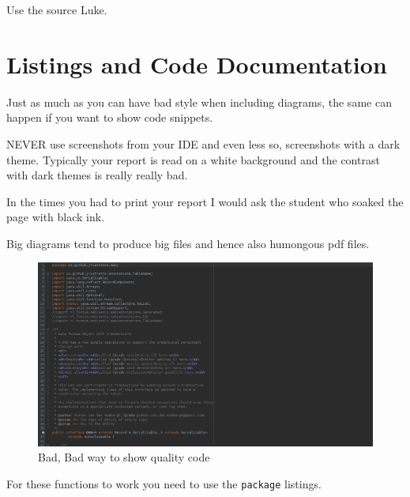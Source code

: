 \def\TheFile{ch05_codelisting.tex}
\begin{savequote}[15cm]
  \vspace{-30mm}
  \sffamily\raggedleft
  Use the source Luke.
\end{savequote}

\chapter{Listings and Code Documentation}
\label{chap:listings}
Just as much as you can have bad style when including diagrams, the same can happen if
you want to show code snippets.

\begin{Itemize}
\item {\color{red!60!black}\Huge{}NEVER} use screenshots from your IDE and even less so, screenshots with a dark theme.
  Typically your report is read on a white background and the contrast with dark themes is really really bad.
\item In the times you had to print your report I would ask the student who soaked the page with black ink.
\item Big diagrams tend to produce big files and hence also humongous pdf files.
\end{Itemize}

\begin{figure}
  \caption{Bad, Bad way to show quality code}
  \includegraphics[width=\textwidth]{images/dao.png}
\end{figure}

For these functions to work you need to use the \texttt{package} listings.


